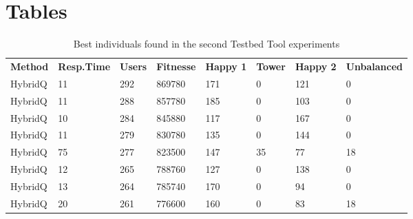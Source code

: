 \chapter{Tables}

\begin{table}[h!]
\centering
\caption{Best individuals found in the second Testbed Tool experiments}
\label{tab:bestexperiment2}
\begin{tabular}{llllllll}
\rowcolor[HTML]{EFEFEF} 
\textbf{Method} & \textbf{Resp.Time} & \textbf{Users} & \textbf{Fitnesse} & \textbf{Happy 1} & \textbf{Tower} & \textbf{Happy 2} & \textbf{Unbalanced} \\
HybridQ                & 11                     & 292            & 869780                  & 171              & 0                    & 121              & 0                   \\
HybridQ                & 11                     & 288            & 857780                  & 185              & 0                    & 103              & 0                   \\
HybridQ                & 10                      & 284            & 845880                  & 117              & 0                    & 167              & 0                   \\
HybridQ                & 11                     & 279            & 830780                  & 135              & 0                    & 144              & 0                   \\
HybridQ                & 75                     & 277            & 823500                  & 147              & 35                   & 77               & 18                  \\
HybridQ                & 12                     & 265            & 788760                  & 127              & 0                    & 138              & 0                   \\
HybridQ                & 13                     & 264            & 785740                  & 170              & 0                    & 94               & 0                   \\
HybridQ                & 20                     & 261            & 776600                  & 160              & 0                    & 83               & 18                  \\

\end{tabular}
\end{table}

